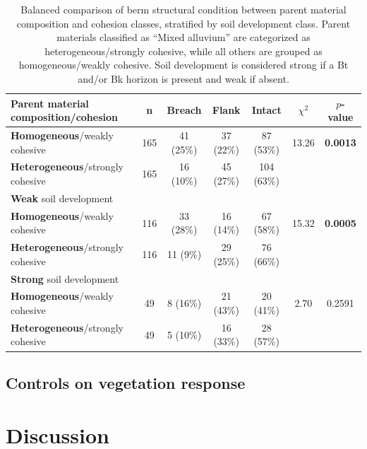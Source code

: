 \documentclass[review]{elsarticle}
\begin{document}
\begin{table}[h!]
\centering
\caption{\normalsize Balanced comparison of berm structural condition between parent material composition and cohesion classes, stratified by soil development class. Parent materials classified as ``Mixed alluvium'' are categorized as heterogeneous/strongly cohesive, while all others are grouped as homogeneous/weakly cohesive. Soil development is considered strong if a Bt and/or Bk horizon is present and weak if absent.}
\small
\begin{tabular}{|l|c|c|c|c|c|c|}
\hline
\textbf{Parent material composition/cohesion} & \textbf{n} & \textbf{Breach} & \textbf{Flank} & \textbf{Intact} & \textbf{$\chi^2$} & \textbf{$p$-value} \\
\hline
\textbf{Homogeneous}/weakly cohesive & 165 & 41 (25\%) & 37 (22\%) & 87 (53\%) & 13.26 & \textbf{0.0013}\\
\hline
\textbf{Heterogeneous}/strongly cohesive & 165 & 16 (10\%) & 45 (27\%) & 104 (63\%) &  &\\
\hline
\hline
\textbf{Weak} soil development & & & & & & \\
\hline
\textbf{Homogeneous}/weakly cohesive & 116 & 33 (28\%) & 16 (14\%) & 67 (58\%) & 15.32 & \textbf{0.0005} \\
\hline
\textbf{Heterogeneous}/strongly cohesive & 116 & 11 (9\%) & 29 (25\%) & 76 (66\%) &  & \\
\hline
\hline
\textbf{Strong} soil development & & & & & & \\
\hline
\textbf{Homogeneous}/weakly cohesive & 49 & 8 (16\%) & 21 (43\%) & 20 (41\%) & 2.70 & 0.2591\\
\hline
\textbf{Heterogeneous}/strongly cohesive & 49 & 5 (10\%) & 16 (33\%) & 28 (57\%) &  &  \\
\hline
\end{tabular}
\label{tab:parentmat_soildev_chi}
\end{table}


\subsection{Controls on vegetation response}




\section{Discussion}
\end{document}
